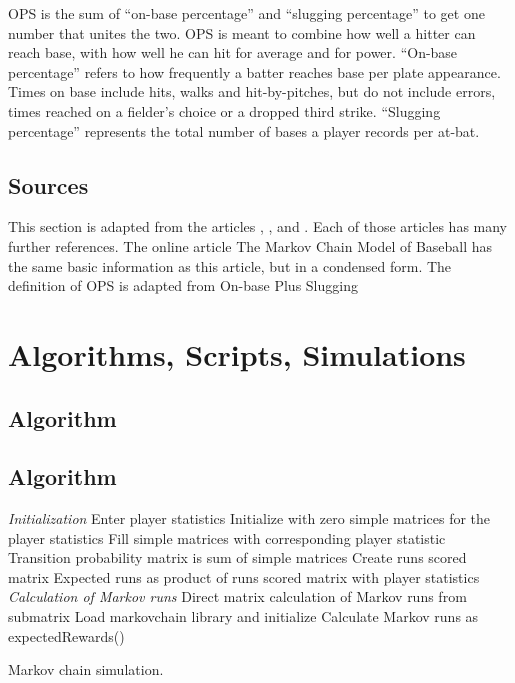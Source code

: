 \documentclass[12pt]{article}
\begin{document}
OPS is the sum of ``on-base percentage'' and ``slugging percentage'' to
get one number that unites the two.  OPS is meant to combine how well a
hitter can reach base, with how well he can hit for average and for
power.  ``On-base percentage'' refers to how frequently a batter reaches
base per plate appearance.  Times on base include hits, walks and
hit-by-pitches, but do not include errors, times reached on a fielder's
choice or a dropped third strike.  ``Slugging percentage'' represents
the total number of bases a player records per at-bat.

\subsection*{Sources} This section is adapted from the articles
\cite{cover77},
\cite{dangelo10},
\cite{osbourne20} and
\cite{pankin}.  Each of those articles has many further references.  The
online article 
{The Markov Chain Model of Baseball} has the same basic information as
this article, but in a condensed form. The definition of OPS is adapted
from 
{On-base Plus Slugging}

\nocite{}
\nocite{}

\hr

\section*{Algorithms, Scripts, Simulations}

\subsection*{Algorithm}

\subsection*{Algorithm}

\begin{algorithm}[H]
    \DontPrintSemicolon
    \BlankLine
    \emph{Initialization}\;
    Enter player statistics\;
    Initialize with zero simple matrices for the player statistics\;
    Fill simple matrices with corresponding player statistic\;
    Transition probability matrix is sum of simple matrices\;
    Create runs scored matrix\;
    Expected runs as product of runs scored matrix with player statistics\;
    \BlankLine
    \emph{Calculation of Markov runs}\;
    Direct matrix calculation of Markov runs from submatrix\;
    Load markovchain library and initialize\;
    Calculate Markov runs as expectedRewards()
    \caption{Markov chain simulation.}
\end{algorithm}
\end{document}

